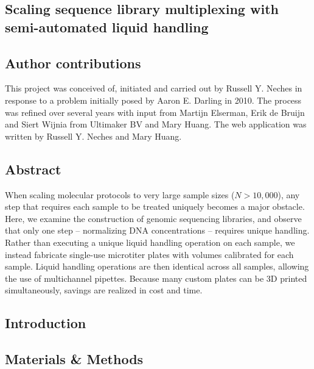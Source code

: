 \begin{refsection}

\chapter{Scaling sequence library multiplexing with semi-automated liquid handling}


\section{Author contributions}

This project was conceived of, initiated and carried out by Russell Y. Neches in response to a problem initially posed by Aaron E. Darling in 2010. The process was refined over several years with input from Martijn Elserman, Erik de Bruijn and Siert Wijnia from Ultimaker BV and Mary Huang. The web application was written by Russell Y. Neches and Mary Huang.

\section{Abstract}

When scaling molecular protocols to very large sample sizes ($N > 10,000$), any step that requires each sample to be treated uniquely becomes a major obstacle. Here, we examine the construction of genomic sequencing libraries, and observe that only one step -- normalizing DNA concentrations -- requires unique handling. Rather than executing a unique liquid handling operation on each sample, we instead fabricate single-use microtiter plates with volumes calibrated for each sample. Liquid handling operations are then identical across all samples, allowing the use of multichannel pipettes. Because many custom plates can be 3D printed simultaneously, savings are realized in cost and time.

\section{Introduction}



\section{Materials \& Methods}


\end{refsection}
